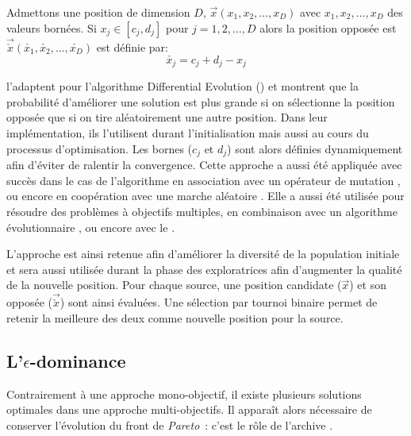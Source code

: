 \begin{Def}\label{def:oblm}
Admettons une position de dimension $D$, $\vec{x}(x_{1}, x_{2}, \dotsc, x_{D})$ avec
$x_{1}, x_{2}, \dotsc, x_{D}$ des valeurs bornées. Si $x_{j} \in [c_{j}, d_{j}]$ pour
$j = 1, 2, \dotsc, D$ alors la position opposée est $\vec{\check{x}}(\check{x_{1}},%
\check{x_{2}}, \dotsc, \check{x_{D}})$ est définie par:
\[\check{x_{j}} = c_{j} + d_{j} - x_{j}\]
\end{Def}

\textcite{Rahnamayan2008906} l’adaptent pour l’algorithme Differential Evolution ()
et montrent que la probabilité d’améliorer une solution est plus grande si on sélectionne
la position opposée que si on tire aléatoirement une autre position.
Dans leur implémentation, ils l’utilisent durant l’initialisation mais aussi au cours du
processus d’optimisation. Les bornes ($c_{j}$ et $d_{j}$) sont alors définies dynamiquement
afin d’éviter de ralentir la convergence.
Cette approche a aussi été appliquée avec succès dans le cas de l’algorithme 
en association avec un opérateur de mutation \parencite{Bi2011174}, ou encore en coopération
avec une marche aléatoire \parencite{Sharma2012213}. Elle a aussi été utilisée pour
résoudre des problèmes à objectifs multiples, en combinaison avec un algorithme
évolutionnaire \parencite{Ma201448}, ou encore avec le  \parencite{Gao2013114}.

L’approche est ainsi retenue afin d’améliorer la diversité de la population initiale
et sera aussi utilisée durant la phase des exploratrices afin d’augmenter la qualité
de la nouvelle position.
Pour chaque source, une position candidate ($\vec{x}$) et son opposée
($\vec{\check{x}}$) sont ainsi évaluées. Une sélection par tournoi binaire permet
de retenir la meilleure des deux comme nouvelle position pour la source.


\subsection[L’epsilon-dominance]{L’$\epsilon$-dominance} %
\label{sub:l_epsilon_dominance}
Contrairement à une approche mono-objectif, il existe plusieurs solutions optimales
dans une approche multi-objectifs. Il apparaît alors nécessaire de conserver l’évolution
du front de \textit{Pareto}~: c’est le rôle de l’archive \parencite{Laumanns2002263}.

